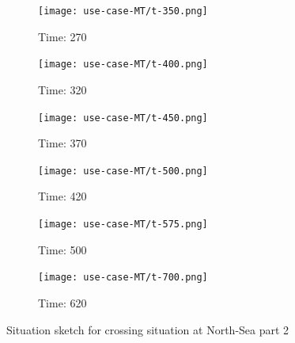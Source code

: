 \begin{figure}[p]
	\centering
	
	\begin{subfigure}{0.49\textwidth}
		\texttt{[image: use-case-MT/t-350.png]}
		\caption{Time: 270}
	\end{subfigure}
	\hfill
	\begin{subfigure}{0.49\textwidth}
		\texttt{[image: use-case-MT/t-400.png]}
		\caption{Time: 320}
	\end{subfigure}
	
	\medskip \bigskip
	\begin{subfigure}{0.49\textwidth}
		\texttt{[image: use-case-MT/t-450.png]}
		\caption{Time: 370}
	\end{subfigure}
	\hfill
	\begin{subfigure}{0.49\textwidth}
		\texttt{[image: use-case-MT/t-500.png]}
		\caption{Time: 420}
	\end{subfigure}
	
	\medskip \bigskip
	\begin{subfigure}{0.49\textwidth}
		\texttt{[image: use-case-MT/t-575.png]}
		\caption{Time: 500}
	\end{subfigure}
	\hfill
	\begin{subfigure}{0.49\textwidth}
		\texttt{[image: use-case-MT/t-700.png]}
		\caption{Time: 620}
	\end{subfigure}
	
	\caption{Situation sketch for crossing situation at North-Sea part 2}
	\label{fig:use-case-2}
\end{figure}

\clearpage




